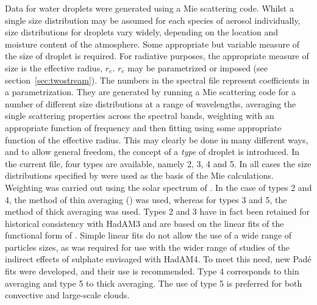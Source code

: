 \begin{enumerate}
Data for water droplets were generated using a Mie scattering code. 
Whilst a single size distribution may be assumed for each species
of aerosol individually, size distributions for droplets vary widely,
depending on the location and moisture content of the atmosphere. Some
appropriate but variable measure of the size of droplet is required.
For radiative purposes, the
appropriate measure of size is the effective radius, $r_e$. $r_e$
may be parametrized or imposed (see section~\ref{sec:twostream}). The numbers in the
spectral file represent coefficients in a parametrization. They
are generated by running a Mie scattering code for a number of different
size distributions at a range of wavelengths, averaging the single
scattering properties across the spectral bands, weighting with an
appropriate function of frequency and then fitting using some appropriate
function of the effective radius. This may clearly be done in many
different ways, and to allow general freedom, the concept of a {\em
type} of droplet is introduced. In the current file, four types are available,
namely 2, 3, 4 and 5. In all cases the size distributions specified by 
\citet{Rockel91} were used as the basis of the Mie calculations. Weighting
was carried out using the solar spectrum of \citet{Labs70}. In the case of
types 2 and 4, the method of thin averaging (\citet{Edwards96rc}) was used,
whereas for types 3 and 5, the method of thick averaging was used. 
Types 2 and 3 have in fact been retained for historical consistency with
HadAM3 and are based on the linear fits of the functional form of
\citet{Slingo82}. Simple linear fits do not allow the use of a wide range
of particles sizes, as was required for use with the wider range of
studies of the indirect effects of sulphate envisaged with HadAM4.
To meet this need, new Pad\'e fits were developed, and their use is 
recommended. Type 4 corresponds to thin averaging and type 5 to thick
averaging. The use of type 5 is preferred for both convective and large-scale
clouds.


\end{enumerate}
